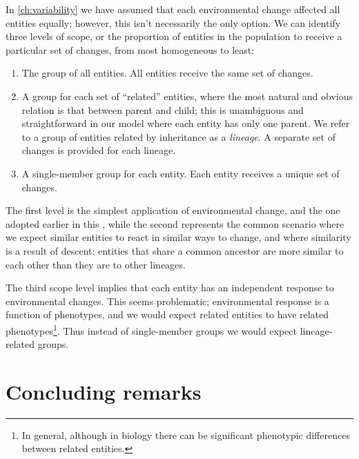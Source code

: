 In \cref{ch:variability} we have assumed that each environmental change affected all entities equally; however, this isn't necessarily the only option. We can identify three levels of scope, or the proportion of entities in the population to receive a particular set of changes, from most homogeneous to least:

\begin{enumerate}
	\item The group of all entities. All entities receive the same set of changes.
	\item A group for each set of ``related'' entities, where the most natural and obvious relation is that between parent and child; this is unambiguous and straightforward in our model where each entity has only one parent. We refer to a group of entities related by inheritance as a \emph{lineage}. A separate set of changes is provided for each lineage.
	\item A single-member group for each entity. Each entity receives a unique set of changes.
\end{enumerate}

The first level is the simplest application of environmental change, and the one adopted earlier in this , while the second represents the common scenario where we expect similar entities to react in similar ways to change, and where similarity is a result of descent: entities that share a common ancestor are more similar to each other than they are to other lineages. 

The third scope level implies that each entity has an independent response to environmental changes. This seems problematic; environmental response is a function of phenotypes, and we would expect related entities to have related phenotypes\footnote{In general, although in biology there can be significant phenotypic differences between related entities.}. Thus instead of single-member groups we would expect lineage-related groups.

\section{Concluding remarks}

